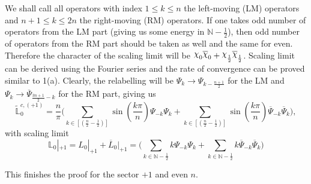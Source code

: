 \documentclass[twoside,11pt,titlepage]{amsart}
\renewcommand{\=}[1]{\stackrel{#1}{=}} %
\theoremstyle{definition}
\theoremstyle{remark}
\DeclareRobustCommand{\rchi}{{\mathpalette\irchi\relax}}
\newcommand{\irchi}[2]{\raisebox{\depth}{$#1\chi$}}
\begin{document}
We shall call all operators with index $1\le k\le n$ the left-moving (LM) operators and $n+1\le k\le 2n$ the right-moving (RM) operators. If one takes odd number of operators from the LM part (giving us some energy in $\mathbb{N}-\frac{1}{2}$), then odd number of operators from the RM part should be taken as well and the same for even. Therefore the character of the scaling limit will be $\rchi_0\overline{\rchi}_0+\rchi_{\frac{1}{2}}\overline{\rchi}_{\frac{1}{2}}$. Scaling limit can be derived using the Fourier series and the rate of convergence can be proved similar to 1(a). Clearly, the relabelling will be $\Psi_k \to \Psi_{k-\frac{n+1}{2}}$ for the LM and $\Psi_k \to \overline{\Psi}_{\frac{3n+1}{2}-k}$ for the RM part, giving us
$$\widetilde{\mathbb{L}}_0^{c,(+1)}=\frac{n}{\pi}\Big(\sum_{k \in [(\frac{n}{2}-\frac{1}{2})]} \sin(\frac{k\pi}{n})\Psi_{-k}\Psi_{k}+\sum_{k\in [(\frac{n}{2}-\frac{1}{2})]} \sin(\frac{k\pi}{n})\overline{\Psi}_{-k}\overline{\Psi}_{k}\Big),$$
with scaling limit
$$\mathbb{L}_0|_{+1}=L_0|_{+1}+\overline{L}_0|_{+1}=(\sum_{k \in \mathbb{N}-\frac{1}{2}} k\Psi_{-k}\Psi_{k}+\sum_{k\in \mathbb{N}-\frac{1}{2}} k\overline{\Psi}_{-k}\overline{\Psi}_{k}\Big)$$

This finishes the proof for the sector $+1$ and even $n$.
\end{document}
